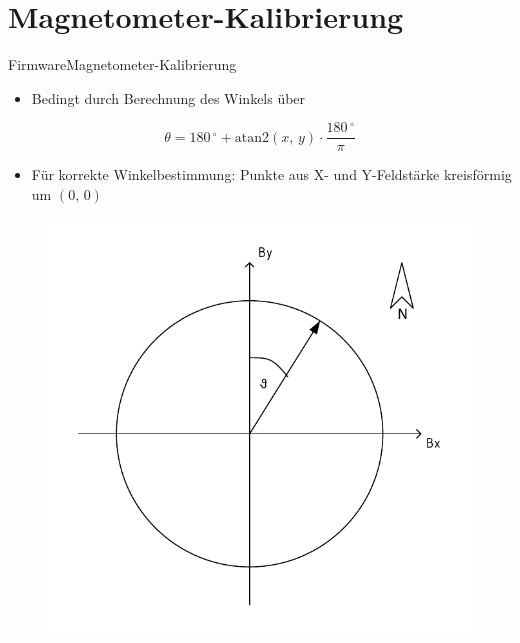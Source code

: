 \documentclass{beamer}
\begin{document}

%   

\begin{frame}

\end{frame}

\appendix
\section{Magnetometer-Kalibrierung}
\begin{frame}{Firmware}{Magnetometer-Kalibrierung}
    \begin{itemize}
        \item Bedingt durch Berechnung des Winkels über
    \end{itemize}
    \begin{equation*}
        \theta = 180\,^\circ + \mathrm{atan2}(x,\,y) \cdot \frac{180\,^\circ}{\pi}
    \end{equation*}
    \begin{itemize}
        \item Für korrekte Winkelbestimmung: Punkte aus X- und Y-Feldstärke kreisförmig um $(0,\,0)$
    \end{itemize}
    \begin{figure}[H]
        \centering
        \includegraphics[width=.5\textwidth]{./img/Kursber.pdf}
    \end{figure}
\end{frame}
\end{document}

